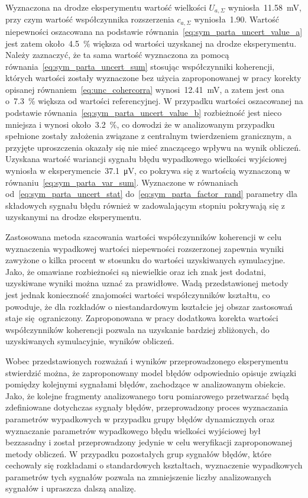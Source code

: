 Wyznaczona na drodze eksperymentu wartość wielkości $U_{a,\Sigma}$ wyniosła~\qty{11.58}{mV}, przy czym wartość współczynnika rozszerzenia $c_{a,\Sigma}$ wyniosła~\num{1.90}. Wartość niepewności oszacowana na podstawie równania~\eqref{eq:sym_parta_uncert_value_a} jest zatem około~\qty{4.5}{\percent} większa od wartości uzyskanej na drodze eksperymentu. Należy zaznaczyć, że ta sama wartość wyznaczona za pomocą równania~\eqref{eq:sym_parta_uncert_sum} stosując współczynniki koherencji, których wartości zostały wyznaczone bez użycia zaproponowanej w pracy korekty opisanej równaniem~\eqref{eq:unc_cohercorra} wynosi~\qty{12.41}{mV}, a zatem jest ona o~\qty{7.3}{\percent} większa od wartości referencyjnej. W przypadku wartości oszacowanej na podstawie równania~\eqref{eq:sym_parta_uncert_value_b} rozbieżność jest nieco mniejsza i wynosi około~\qty{3.2}{\percent}, co dowodzi że w analizowanym przypadku spełnione zostały założenia związane z centralnym twierdzeniem granicznym, a przyjęte uproszczenia okazały się nie mieć znaczącego wpływu na wynik obliczeń. Uzyskana wartość wariancji sygnału błędu wypadkowego wielkości wyjściowej wyniosła w eksperymencie~\qty{37.1}{\micro V}, co pokrywa się z wartością wyznaczoną w równaniu~\eqref{eq:sym_parta_var_sum}. Wyznaczone w równaniach od~\eqref{eq:sym_parta_uncert_stat} do~\eqref{eq:sym_parta_factor_rand} parametry dla składowych sygnału błędu również w zadowalającym stopniu pokrywają się z uzyskanymi na drodze eksperymentu.

Zastosowana metoda szacowania wartości współczynników koherencji w celu wyznaczenia wypadkowej wartości niepewności rozszerzonej zapewnia wyniki zawyżone o kilka procent w stosunku do wartości uzyskiwanych symulacyjne. Jako, że omawiane rozbieżności są niewielkie oraz ich znak jest dodatni, uzyskiwane wyniki można uznać za prawidłowe. Wadą przedstawionej metody jest jednak konieczność znajomości wartości współczynników kształtu, co powoduje, że dla rozkładów o niestandardowym kształcie jej obszar zastosowań staje się ograniczony. Zaproponowana w pracy dodatkowa korekta wartości współczynników koherencji pozwala na uzyskanie bardziej zbliżonych, do uzyskiwanych symulacyjnie, wyników obliczeń.

Wobec przedstawionych rozważań i wyników przeprowadzonego eksperymentu stwierdzić można, że zaproponowany model błędów odpowiednio opisuje związki pomiędzy kolejnymi sygnałami błędów, zachodzące w analizowanym obiekcie. Jako, że kolejne fragmenty analizowanego toru pomiarowego przetwarzać będą zdefiniowane dotychczas sygnały błędów, przeprowadzony proces wyznaczania parametrów wypadkowych w przypadku grupy błędów dynamicznych oraz wyznaczanie parametrów wypadkowego błędu wielkości wyjściowej był bezzasadny i został przeprowadzony jedynie w celu weryfikacji zaproponowanej metody obliczeń. W przypadku pozostałych grup sygnałów błędów, które cechowały się rozkładami o standardowych kształtach, wyznaczenie wypadkowych parametrów tych sygnałów pozwala na zmniejszenie liczby analizowanych sygnałów i upraszcza dalszą analizę.

